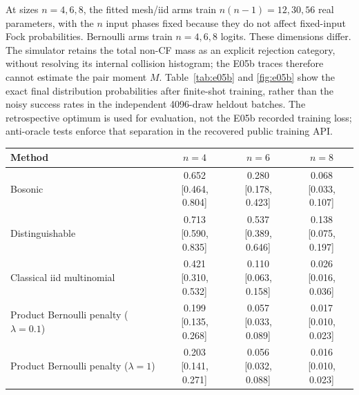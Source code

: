 At sizes $n=4,6,8$, the fitted mesh/iid arms train $n(n-1)=12,30,56$ real parameters, with the $n$ input phases fixed because they do not affect fixed-input Fock probabilities. Bernoulli arms train $n=4,6,8$ logits. These dimensions differ. The simulator retains the total non-CF mass as an explicit rejection category, without resolving its internal collision histogram; the E05b traces therefore cannot estimate the pair moment $M$. Table~\ref{tab:e05b} and \cref{fig:e05b} show the exact final distribution probabilities after finite-shot training, rather than the noisy success rates in the independent 4096-draw heldout batches. The retrospective optimum is used for evaluation, not the E05b recorded training loss; anti-oracle tests enforce that separation in the recovered public training API.

\begin{table}[t]
\centering\small
\setlength{\tabcolsep}{3pt}
\begin{tabular}{lccc}
\hline
Method & $n=4$ & $n=6$ & $n=8$ \\
\hline
Bosonic & \shortstack{0.652\\{[0.464, 0.804]}} & \shortstack{0.280\\{[0.178, 0.423]}} & \shortstack{0.068\\{[0.033, 0.107]}} \\
Distinguishable & \shortstack{0.713\\{[0.590, 0.835]}} & \shortstack{0.537\\{[0.389, 0.646]}} & \shortstack{0.138\\{[0.075, 0.197]}} \\
Classical iid multinomial & \shortstack{0.421\\{[0.310, 0.532]}} & \shortstack{0.110\\{[0.063, 0.158]}} & \shortstack{0.026\\{[0.016, 0.036]}} \\
Product Bernoulli penalty ($\lambda=0.1$) & \shortstack{0.199\\{[0.135, 0.268]}} & \shortstack{0.057\\{[0.033, 0.089]}} & \shortstack{0.017\\{[0.010, 0.023]}} \\
Product Bernoulli penalty ($\lambda=1$) & \shortstack{0.203\\{[0.141, 0.271]}} & \shortstack{0.056\\{[0.032, 0.088]}} & \shortstack{0.016\\{[0.010, 0.023]}} \\

\end{tabular}
\end{table}
